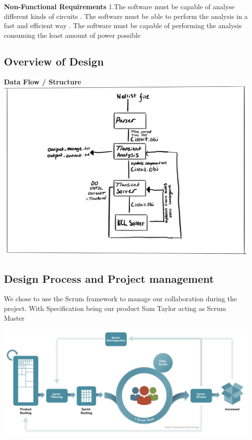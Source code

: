 \documentclass{article}
\begin{document}
\bigbreak

\textbf{Non-Functional Requirements}
\newline
1.The software must be capable of analyse different kinds of circuits
. The software must be able to perform the analysis in a fast and efficient way
. The software must be capable of performing the analysis consuming the least amount of power possible

\newpage

\subsection{Overview of Design}
\textbf{Data Flow / Structure}
\includegraphics[width=15cm]{images/Comphpp.jpg}
\newpage

\subsection{Design Process and Project management}

We chose to use the Scrum framework to manage our collaboration during the project. With Specification being our product  Sam Taylor acting as Scrum Master

\includegraphics[width=15cm]{images/ScrumFramework.jpg}
\end{document}
